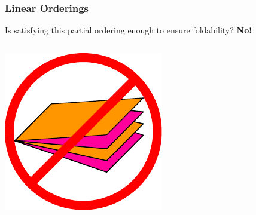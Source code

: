 \documentclass{beamer}
\begin{document}
\begin{frame}

\frametitle{Linear Orderings}
Is satisfying this partial ordering enough to ensure foldability? \pause \textbf{No!}

\pause
\bigskip

\begin{columns}[c]
\includegraphics[width=\textwidth]{sam_images/bad-butterfly.pdf}
\end{columns}

\end{frame}
\end{document}
